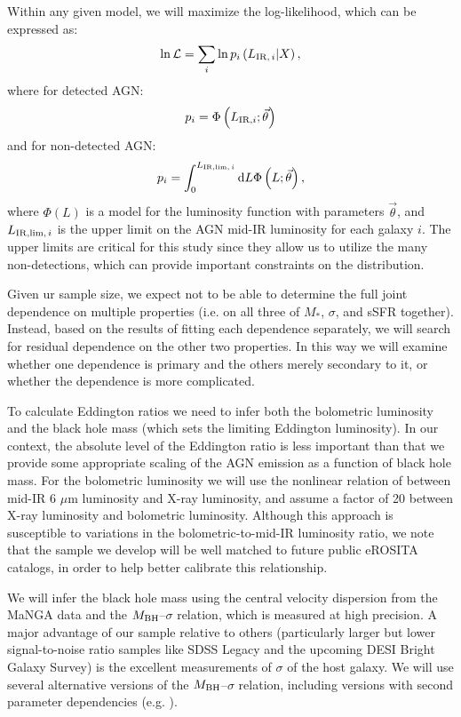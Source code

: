 \documentclass[12pt, preprint]{hacked-aastex}
\begin{document}
Within any given model, we will maximize the log-likelihood, which can
be expressed as:
\begin{equation}
\ln \mathcal{L} = \sum_i \ln p_i\left(L_{{\rm IR},\,i}  | X\right),
\end{equation}
where for detected AGN:
\begin{equation}
p_i = \Phi\left(L_{{\rm IR}, i}; \vec{\theta} \right)
\end{equation}
and for non-detected AGN:
\begin{equation}
p_i = \int_0^{L_{{\rm IR, lim},\,i}} {\rm d}L \Phi\left(L; \vec{\theta}\right),
\end{equation}
where $\Phi(L)$ is a model for the luminosity function with
parameters $\vec{\theta}$, and $L_{{\rm IR, lim},\,i}$ is the upper limit 
on the AGN mid-IR luminosity for each galaxy $i$.
The upper limits are critical for this study since they allow
us to utilize the many non-detections, which can provide important
constraints on the distribution.

Given ur sample size, we expect not to be able to determine the full
joint dependence on multiple properties (i.e. on all three of
$M_\ast$, $\sigma$, and sSFR together). Instead, based on the results
of fitting each dependence separately, we will search for residual
dependence on the other two properties. In this way we will examine
whether one dependence is primary and the others merely secondary to
it, or whether the dependence is more complicated.

To calculate Eddington ratios we need to infer both the bolometric
luminosity and the black hole mass (which sets the limiting Eddington
luminosity). In our context, the absolute level of the Eddington ratio
is less important than that we provide some appropriate scaling of the
AGN emission as a function of black hole mass.  For the bolometric
luminosity we will use the nonlinear relation of \cite{stern15a}
between mid-IR 6 $\mu$m luminosity and X-ray luminosity, and assume a
factor of 20 between X-ray luminosity and bolometric
luminosity. Although this approach is susceptible to variations in the
bolometric-to-mid-IR luminosity ratio, we note that the sample we
develop will be well matched to future public eROSITA catalogs, in
order to help better calibrate this relationship.

We will infer the black hole mass using the central velocity
dispersion from the MaNGA data and the $M_{\rm BH}$--$\sigma$
relation, which is measured at high precision.  A major advantage of
our sample relative to others (particularly larger but lower
signal-to-noise ratio samples like SDSS Legacy and the upcoming DESI
Bright Galaxy Survey) is the excellent measurements of $\sigma$ of the
host galaxy. We will use several alternative versions of the $M_{\rm
  BH}$--$\sigma$ relation, including versions with second parameter
dependencies (e.g. \cite{kormendy13a, vandenbosch16a, shankar16a}).
\end{document}
